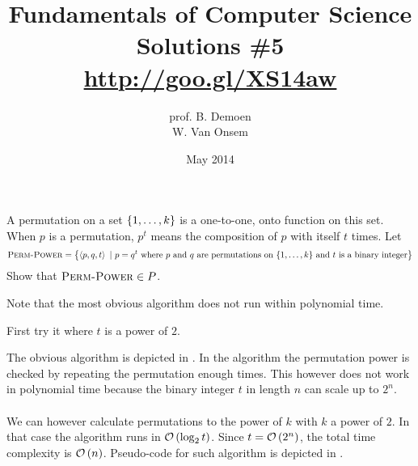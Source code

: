 \documentclass{article}
\title{Fundamentals of Computer Science\\Solutions \#5\\\url{http://goo.gl/XS14aw}}
\author{prof. B. Demoen\\W. Van Onsem}
\date{May 2014}
\begin{document}
\maketitle
\begin{exercise}
A permutation on a set $\left\{ 1,\ldots,k \right\}$ is a one-to-one, onto function on this set. When $p$ is a permutation, $p^t$ means the composition of $p$ with itself $t$ times. Let
\begin{equation}
\mbox{\textsc{Perm-Power}}=\left\{ \left\langle p, q, t \right\rangle\ |\ p = q^t\mbox{ where $p$ and $q$ are permutations on $\left\{ 1,\ldots,k \right\}$ and $t$ is a binary integer} \right\}
\end{equation}
Show that $\mbox{\textsc{Perm-Power}}\in P$.
\begin{note}
Note that the most obvious algorithm does not run within polynomial time.
\end{note}
\begin{hint}
First try it where $t$ is a power of $2$.
\end{hint}
\begin{answer}
The obvious algorithm is depicted in . In the algorithm the permutation power is checked by repeating the permutation enough times. This
however does not work in polynomial time because the binary integer $t$ in length $n$ can scale up to $2^n$.
\paragraph{}
We can however calculate permutations to the power of $k$ with $k$ a power of $2$. In that case the algorithm runs in $\mathcal{O}\left( \log_2 t \right)$. Since
$t=\mathcal{O}\left( 2^n \right)$, the total time complexity is $\mathcal{O}\left( n \right)$. Pseudo-code for such algorithm is depicted in .
\end{answer}
\end{exercise}
\end{document}
